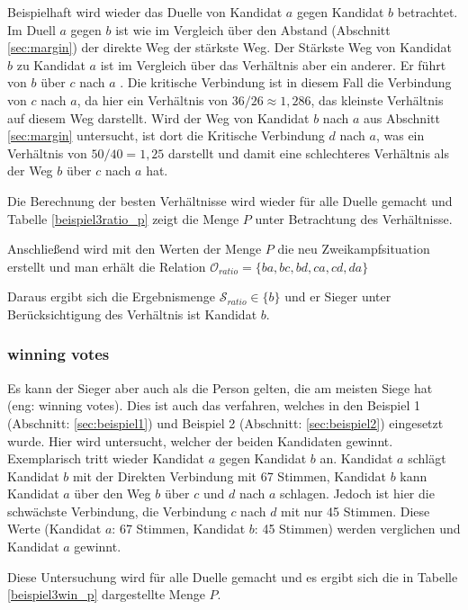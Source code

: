 Beispielhaft wird wieder das Duelle von Kandidat $a$ gegen Kandidat $b$ betrachtet. Im Duell $a$ gegen $b$ ist wie im Vergleich über den Abstand (Abschnitt \ref{sec:margin}) der direkte Weg der stärkste Weg. Der Stärkste Weg von Kandidat $b$ zu Kandidat $a$ ist im Vergleich über das Verhältnis aber ein anderer. Er führt von $b$ über $c$ nach $a$ . Die kritische Verbindung ist in diesem Fall die Verbindung von $c$ nach $a$, da hier ein Verhältnis von $36/26 \approx 1,286$, das kleinste Verhältnis auf diesem Weg darstellt. Wird der Weg von Kandidat $b$ nach $a$ aus Abschnitt \ref{sec:margin} untersucht, ist dort die Kritische Verbindung $d$ nach $a$, was ein Verhältnis von $ 50/40 = 1,25$ darstellt und damit eine schlechteres Verhältnis als der Weg $b$ über $c$ nach $a$ hat.

Die Berechnung der besten Verhältnisse wird wieder für alle Duelle gemacht und  Tabelle \ref{beispiel3ratio_p} zeigt die Menge $P$ unter Betrachtung des Verhältnisse.



Anschließend wird mit den Werten der Menge $P$ die neu Zweikampfsituation erstellt und man erhält die Relation $\mathcal{O}_{ratio} = \{ ba,bc,bd,ca,cd,da \}$

Daraus ergibt sich die Ergebnismenge $\mathcal{S}_{ratio} \in \{ b\}$ und er Sieger unter Berücksichtigung des Verhältnis ist Kandidat $b$.

\newpage
\subsubsection{winning votes}
\label{sec:winningVotes}
Es kann der Sieger aber auch als die Person gelten, die am meisten Siege hat (eng: winning votes). Dies ist auch das verfahren, welches in den Beispiel 1 (Abschnitt: \ref{sec:beispiel1}) und Beispiel 2 (Abschnitt: \ref{sec:beispiel2}) eingesetzt wurde. Hier wird untersucht, welcher der beiden Kandidaten gewinnt. Exemplarisch tritt wieder Kandidat $a$ gegen Kandidat $b$ an. Kandidat $a$ schlägt Kandidat $b$ mit der Direkten Verbindung mit 67 Stimmen, Kandidat $b$ kann Kandidat $a$ über den Weg $b$ über $c$ und $d$ nach $a$ schlagen. Jedoch ist hier die schwächste Verbindung, die Verbindung $c$ nach $d$ mit nur 45 Stimmen. Diese Werte (Kandidat $a$: 67 Stimmen, Kandidat $b$: 45 Stimmen) werden verglichen und Kandidat $a$ gewinnt. 

Diese Untersuchung wird für alle Duelle gemacht und es ergibt sich die in Tabelle \ref{beispiel3win_p} dargestellte Menge $P$.

